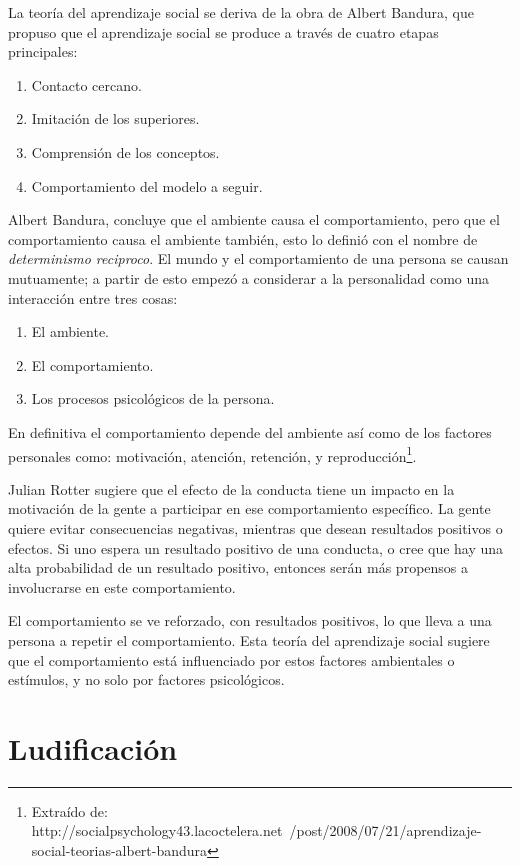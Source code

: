 La teoría del aprendizaje social se deriva de la obra de Albert Bandura, que
propuso que el aprendizaje social se produce a través de cuatro etapas
principales:

\begin{enumerate}
\item Contacto cercano.
\item Imitación de los superiores.
\item Comprensión de los conceptos.
\item Comportamiento del modelo a seguir.
\end{enumerate}

Albert Bandura, concluye que el ambiente causa el comportamiento, pero que el
comportamiento causa el ambiente también, esto lo definió con el nombre de
\emph{determinismo reciproco}. El mundo y el comportamiento de una persona se
causan mutuamente; a partir de esto empezó a considerar a la personalidad como
una interacción entre tres cosas:

\begin{enumerate}
\item El ambiente.
\item El comportamiento.
\item Los procesos psicológicos de la persona.
\end{enumerate}

En definitiva el comportamiento depende del ambiente así como de los factores
personales como: motivación, atención, retención, y
reproducción\footnote{Extraído de: http://socialpsychology43.lacoctelera.net\
/post/2008/07/21/aprendizaje-social-teorias-albert-bandura}.

Julian Rotter sugiere que el efecto de la conducta tiene un impacto en la
motivación de la gente a participar en ese comportamiento específico. La gente
quiere evitar consecuencias negativas, mientras que desean resultados positivos
o efectos. Si uno espera un resultado positivo de una conducta, o cree que hay
una alta probabilidad de un resultado positivo, entonces serán más propensos a
involucrarse en este comportamiento.

El comportamiento se ve reforzado, con resultados positivos, lo que lleva a una
persona a repetir el comportamiento. Esta teoría del aprendizaje social sugiere
que el comportamiento está influenciado por estos factores ambientales o
estímulos, y no solo por factores psicológicos.

\section{Ludificación}

